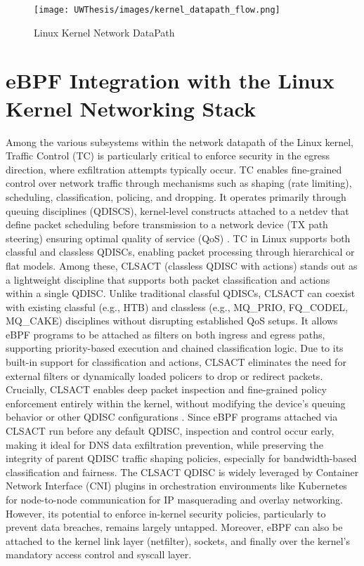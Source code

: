\documentclass [11pt, proquest] {uwthesis}[2020/02/24]
\begin{document}
\label{sec:kernel-network-datapath}
\begin{figure}[h]
\texttt{[image: UWThesis/images/kernel\_datapath\_flow.png]}
\caption{Linux Kernel Network DataPath}
\end{figure}



\section{eBPF Integration with the Linux Kernel Networking Stack}
Among the various subsystems within the network datapath of the Linux kernel, Traffic Control (TC) is particularly critical to enforce security in the egress direction, where exfiltration attempts typically occur. TC enables fine-grained control over network traffic through mechanisms such as shaping (rate limiting), scheduling, classification, policing, and dropping. It operates primarily through queuing disciplines (QDISCS), kernel-level constructs attached to a netdev that define packet scheduling before transmission to a network device (TX path steering) ensuring optimal quality of service (QoS) \cite{salim2015linux} .
TC in Linux supports both classful and classless QDISCs, enabling packet processing through hierarchical or flat models. Among these, CLSACT (classless QDISC with actions) stands out as a lightweight discipline that supports both packet classification and actions within a single QDISC. Unlike traditional classful QDISCs, CLSACT can coexist with existing classful (e.g., HTB) and classless (e.g., MQ\_PRIO, FQ\_CODEL, MQ\_CAKE) disciplines without disrupting established QoS setups. It allows eBPF programs to be attached as filters on both ingress and egress paths, supporting priority-based execution and chained classification logic. Due to its built-in support for classification and actions, CLSACT eliminates the need for external filters or dynamically loaded policers to drop or redirect packets. Crucially, CLSACT enables deep packet inspection and fine-grained policy enforcement entirely within the kernel, without modifying the device’s queuing behavior or other QDISC configurations \cite{borkmann2016getting}. Since eBPF programs attached via CLSACT run before any default QDISC, inspection and control occur early, making it ideal for DNS data exfiltration prevention, while preserving the integrity of parent QDISC traffic shaping policies, especially for bandwidth-based classification and fairness. The CLSACT QDISC is widely leveraged by Container Network Interface (CNI) plugins in orchestration environments like Kubernetes for node-to-node communication for IP masquerading and overlay networking. However, its potential to enforce in-kernel security policies, particularly to prevent data breaches, remains largely untapped. Moreover, eBPF can also be attached to the kernel link layer (netfilter), sockets, and finally over the kernel's mandatory access control and syscall layer. 
\end{document}
